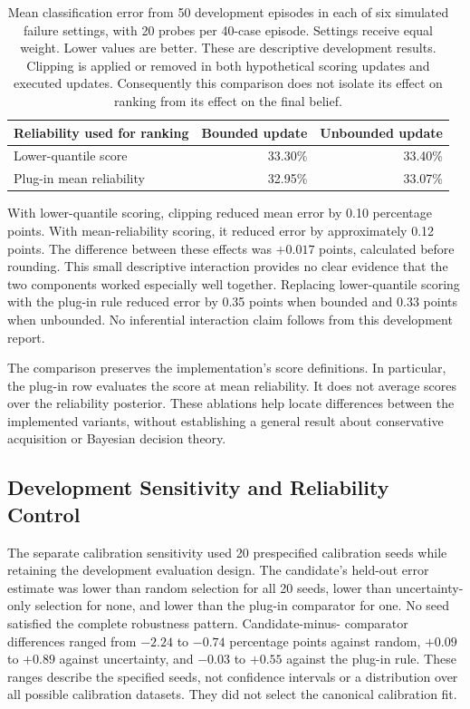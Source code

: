 \begin{table}[htbp]
  \centering
  \begin{tabular}{@{}lrr@{}}
    \toprule
    Reliability used for ranking & Bounded update & Unbounded update \\
    \midrule
    Lower-quantile score & 33.30\% & 33.40\% \\
    Plug-in mean reliability & 32.95\% & 33.07\% \\
    \bottomrule
  \end{tabular}
  \caption{Mean classification error from 50 development episodes in each of six simulated failure settings, with 20 probes
  per 40-case episode. Settings receive equal weight. Lower values are better. These are descriptive development results.
  Clipping is applied or removed in both hypothetical scoring updates and executed updates. Consequently this comparison does
  not isolate its effect on ranking from its effect on the final belief.}
  \label{tab:acquisition-ablation}
\end{table}

With lower-quantile scoring, clipping reduced mean error by 0.10 percentage points. With mean-reliability scoring, it reduced
error by approximately 0.12 points. The difference between these effects was $+0.017$ points, calculated before rounding.
This small descriptive interaction provides no clear evidence that the two components worked especially well together.
Replacing lower-quantile scoring with the plug-in rule reduced error by 0.35 points when bounded and 0.33 points when unbounded.
No inferential interaction claim follows from this development report.

The comparison preserves the implementation's score definitions. In particular, the plug-in row evaluates the score at mean
reliability. It does not average scores over the reliability posterior. These ablations help locate differences between the
implemented variants, without establishing a general result about conservative acquisition or Bayesian decision theory.

\subsection{Development Sensitivity and Reliability Control}

The separate calibration sensitivity used 20 prespecified calibration seeds while retaining the development evaluation design.
The candidate's held-out error estimate was lower than random selection for all 20 seeds, lower than uncertainty-only selection
for none, and lower than the plug-in comparator for one. No seed satisfied the complete robustness pattern. Candidate-minus-
comparator differences ranged from $-2.24$ to $-0.74$ percentage points against random, $+0.09$ to $+0.89$ against uncertainty,
and $-0.03$ to $+0.55$ against the plug-in rule. These ranges describe the specified seeds, not confidence intervals or a
distribution over all possible calibration datasets. They did not select the canonical calibration fit.

